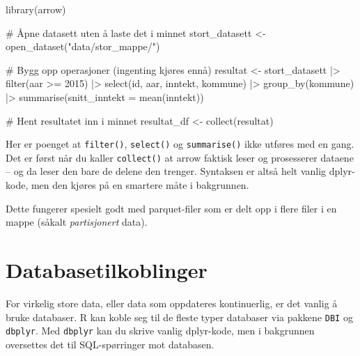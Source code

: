 \documentclass[
  norsk,
  letterpaper,
  DIV=11,
  numbers=noendperiod]{scrreprt}
\newenvironment{Shaded}{\begin{snugshade}}{\end{snugshade}}
\newcommand{\AttributeTok}[1]{\textcolor[rgb]{0.40,0.45,0.13}{#1}}
\newcommand{\CommentTok}[1]{\textcolor[rgb]{0.37,0.37,0.37}{#1}}
\newcommand{\DecValTok}[1]{\textcolor[rgb]{0.68,0.00,0.00}{#1}}
\newcommand{\FunctionTok}[1]{\textcolor[rgb]{0.28,0.35,0.67}{#1}}
\newcommand{\NormalTok}[1]{\textcolor[rgb]{0.00,0.23,0.31}{#1}}
\newcommand{\OtherTok}[1]{\textcolor[rgb]{0.00,0.23,0.31}{#1}}
\newcommand{\SpecialCharTok}[1]{\textcolor[rgb]{0.37,0.37,0.37}{#1}}
\newcommand{\StringTok}[1]{\textcolor[rgb]{0.13,0.47,0.30}{#1}}
\theoremstyle{definition}
\theoremstyle{remark}
\begin{document}
\begin{Shaded}
\begin{Highlighting}[]
\FunctionTok{library}\NormalTok{(arrow)}

\CommentTok{\# Åpne datasett uten å laste det i minnet}
\NormalTok{stort\_datasett }\OtherTok{\textless{}{-}} \FunctionTok{open\_dataset}\NormalTok{(}\StringTok{"data/stor\_mappe/"}\NormalTok{)}

\CommentTok{\# Bygg opp operasjoner (ingenting kjøres ennå)}
\NormalTok{resultat }\OtherTok{\textless{}{-}}\NormalTok{ stort\_datasett }\SpecialCharTok{|\textgreater{}}
  \FunctionTok{filter}\NormalTok{(aar }\SpecialCharTok{\textgreater{}=} \DecValTok{2015}\NormalTok{) }\SpecialCharTok{|\textgreater{}}
  \FunctionTok{select}\NormalTok{(id, aar, inntekt, kommune) }\SpecialCharTok{|\textgreater{}}
  \FunctionTok{group\_by}\NormalTok{(kommune) }\SpecialCharTok{|\textgreater{}}
  \FunctionTok{summarise}\NormalTok{(}\AttributeTok{snitt\_inntekt =} \FunctionTok{mean}\NormalTok{(inntekt))}

\CommentTok{\# Hent resultatet inn i minnet}
\NormalTok{resultat\_df }\OtherTok{\textless{}{-}} \FunctionTok{collect}\NormalTok{(resultat)}
\end{Highlighting}
\end{Shaded}

Her er poenget at \texttt{filter()}, \texttt{select()} og
\texttt{summarise()} ikke utføres med en gang. Det er først når du
kaller \texttt{collect()} at arrow faktisk leser og prosesserer dataene
-- og da leser den bare de delene den trenger. Syntaksen er altså helt
vanlig dplyr-kode, men den kjøres på en smartere måte i bakgrunnen.

Dette fungerer spesielt godt med parquet-filer som er delt opp i flere
filer i en mappe (såkalt \emph{partisjonert} data).

\section{Databasetilkoblinger}\label{databasetilkoblinger}

For virkelig store data, eller data som oppdateres kontinuerlig, er det
vanlig å bruke databaser. R kan koble seg til de fleste typer databaser
via pakkene \texttt{DBI} og \texttt{dbplyr}. Med \texttt{dbplyr} kan du
skrive vanlig dplyr-kode, men i bakgrunnen oversettes det til
SQL-spørringer mot databasen.
\end{document}
